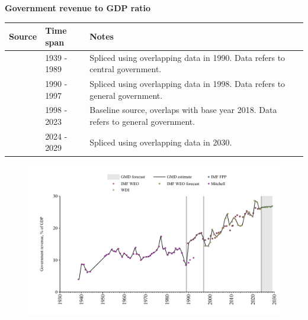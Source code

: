 \documentclass[12pt,a4paper,landscape]{article}
\begin{document}
\begin{adjustbox}{max totalsize={\paperwidth}{\paperheight},center}
\begin{minipage}[t][\textheight][t]{\textwidth}
\vspace*{0.5cm}
{}
\begin{center}
{\Large\bfseries Government revenue to GDP ratio}
\end{center}
\vspace{0.5cm}
\begin{table}[H]
\centering
\small
\begin{tabular}{|l|l|l|}
\hline
\textbf{Source} & \textbf{Time span} & \textbf{Notes} \\
\hline
\rowcolor{white}\cite{Mitchell}& 1939 - 1989 &Spliced using overlapping data in 1990. Data refers to central government.\\
\rowcolor{lightgray}\cite{IMF_WEO}& 1990 - 1997 &Spliced using overlapping data in 1998. Data refers to general government.\\
\rowcolor{white}\cite{WDI}& 1998 - 2023 &Baseline source, overlaps with base year 2018. Data refers to general government.\\
\rowcolor{lightgray}\cite{IMF_WEO_forecast}& 2024 - 2029 &Spliced using overlapping data in 2030. \\
\hline
\end{tabular}
\end{table}
\begin{figure}[H]
\centering
\includegraphics[width=\textwidth,height=0.6\textheight,keepaspectratio]{graphs/SLV_govrev_GDP.pdf}
\end{figure}
\end{minipage}
\end{adjustbox}
\end{document}
